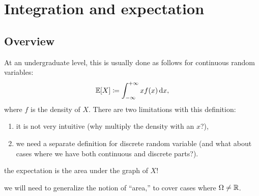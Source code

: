 \documentclass{article}
\begin{document}


\section{Integration and expectation}

\subsection{Overview}

 At an undergraduate level, this is usually done as follows for continuous random variables:
\[ {\mathbb E}[X] \coloneqq \int_{-\infty}^{+\infty} x f(x) \,\mathrm{d} x, \]
where $f$ is the density of $X$. There are two limitations with this definition:
\begin{enumerate}
  \item it is not very intuitive (why multiply the density with an $x$?),
  \item we need a separate definition for discrete random variable (and what about cases where we have both continuous and discrete parts?).
\end{enumerate}

 the expectation is the area under the graph of $X$!

 we will need to generalize the notion of ``area,'' to cover cases where $\Omega \neq {\mathbb R}$.
\end{document}
